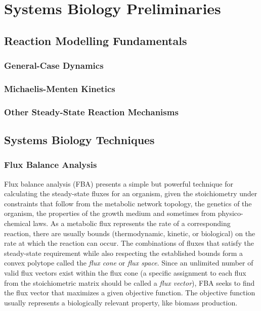 \chapter{Systems Biology Preliminaries}\label{chap:sys}

\section{Reaction Modelling Fundamentals}


\subsection{General-Case Dynamics}

\subsection{Michaelis-Menten Kinetics}

\subsection{Other Steady-State Reaction Mechanisms}

\section{Systems Biology Techniques}

\subsection{Flux Balance Analysis}
Flux balance analysis (FBA) presents a simple but powerful technique for calculating the steady-state fluxes for an organism, given the stoichiometry under constraints that follow from the metabolic network topology, the genetics of the organism, the properties of the growth medium and sometimes from physico-chemical laws. As a metabolic flux represents the rate of a corresponding reaction, there are usually bounds (thermodynamic, kinetic, or biological) on the rate at which the reaction can occur. The combinations of fluxes that satisfy the steady-state requirement while also respecting the established bounds form a convex polytope called the \textit{flux cone} or \textit{flux space}. Since an unlimited number of valid flux vectors exist within the flux cone (a specific assignment to each flux from the stoichiometric matrix should be called a \textit{flux vector}), FBA seeks to find the flux vector that maximizes a given objective function. The objective function usually represents a biologically relevant property, like biomass production.

